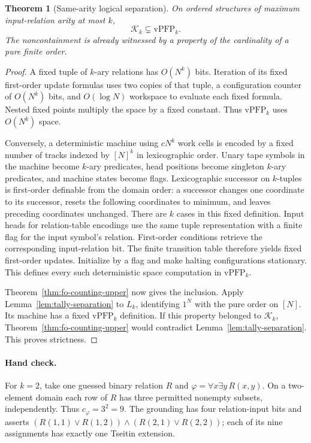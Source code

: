 \documentclass[11pt]{article}
\newtheorem{theorem}{Theorem}[section]
\theoremstyle{definition}
\theoremstyle{remark}
\begin{document}
\begin{theorem}[Same-arity logical separation]
\label{thm:same-arity}
On ordered structures of maximum input-relation arity at most $k$,
\[
 \mathcal K_k\subsetneq\mathrm{vPFP}_k.
\]
The noncontainment is already witnessed by a property of the cardinality
of a pure finite order.
\end{theorem}
\begin{proof}
A fixed tuple of $k$-ary relations has $O(N^k)$ bits. Iteration of its
fixed first-order update formulas uses two copies of that tuple, a
configuration counter of $O(N^k)$ bits, and $O(\log N)$ workspace to
evaluate each fixed formula. Nested fixed points multiply the space
by a fixed constant. Thus $\mathrm{vPFP}_k$ uses $O(N^k)$ space.

Conversely, a deterministic machine using $cN^k$ work cells is encoded
by a fixed number of tracks indexed by $[N]^k$ in lexicographic order.
Unary tape symbols in the machine become $k$-ary predicates, head
positions become singleton $k$-ary predicates, and machine states become
flags. Lexicographic successor on $k$-tuples is first-order definable
from the domain order: a successor changes one coordinate to its
successor, resets the following coordinates to minimum, and leaves
preceding coordinates unchanged. There are $k$ cases in this fixed
definition. Input heads for relation-table encodings use the same tuple
representation with a finite flag for the input symbol's relation.
First-order conditions retrieve the corresponding input-relation bit.
The finite transition table therefore yields fixed first-order updates.
Initialize by a flag and make halting configurations stationary.
This defines every such deterministic space computation in
$\mathrm{vPFP}_k$.

Theorem~\ref{thm:fo-counting-upper} now gives the inclusion. Apply
Lemma~\ref{lem:tally-separation} to $L_k$, identifying $1^N$ with the
pure order on $[N]$. Its machine has a fixed $\mathrm{vPFP}_k$
definition. If this property belonged to $\mathcal K_k$,
Theorem~\ref{thm:fo-counting-upper} would contradict
Lemma~\ref{lem:tally-separation}. This proves strictness.
\end{proof}

\paragraph{Hand check.}
For $k=2$, take one guessed binary relation $R$ and
$\varphi=\forall x\exists y\,R(x,y)$. On a two-element domain each
row of $R$ has three permitted nonempty subsets, independently. Thus
$c_\varphi=3^2=9$. The grounding has four relation-input bits and
asserts $(R(1,1)\vee R(1,2))\wedge(R(2,1)\vee R(2,2))$; each of its
nine assignments has exactly one Tseitin extension.
\end{document}
